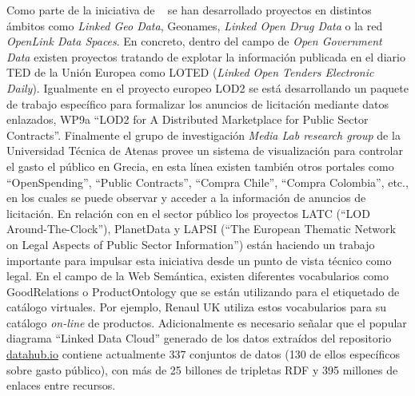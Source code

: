 \documentclass[a4paper,final,11pt,fleqn,twoside]{book}  %
\begin{document}
Como parte de la iniciativa de \lod~\cite{common-vocabularies} se han desarrollado proyectos en distintos 
ámbitos como \textit{Linked Geo Data}, Geonames, \textit{Linked Open Drug Data} o la red 
\textit{OpenLink Data Spaces}. En concreto, dentro del campo de \textit{Open Government Data} 
existen proyectos tratando de explotar la información publicada en el diario TED de la Unión Europea como LOTED (\textit{Linked Open Tenders
Electronic Daily}). Igualmente en el proyecto europeo LOD2 se está desarrollando un paquete 
de trabajo específico para formalizar los anuncios de licitación mediante datos enlazados, 
WP9a ``LOD2 for A Distributed Marketplace for Public Sector Contracts''. Finalmente el grupo 
de investigación \textit{Media Lab research group} de la Universidad Técnica de Atenas provee 
un sistema de visualización para controlar el gasto el público en Grecia, en esta línea existen también otros portales 
como ``OpenSpending'', ``Public Contracts'', ``Compra Chile'', ``Compra Colombia'', etc., en los cuales se 
puede observar y acceder a la información de anuncios de licitación. En relación con \lod en el sector público 
los proyectos LATC (``LOD Around-The-Clock''), PlanetData y LAPSI (``The European Thematic Network on Legal Aspects of Public Sector Information'') 
están haciendo un trabajo importante para impulsar esta iniciativa desde un punto de vista técnico como legal. 
En el campo de la Web Semántica, existen diferentes vocabularios como GoodRelations o ProductOntology que se están utilizando para el etiquetado 
de catálogo virtuales. Por ejemplo, Renaul UK utiliza estos vocabularios para su catálogo \textit{on-line} de productos. 
Adicionalmente es necesario señalar que el popular diagrama ``Linked Data Cloud'' generado de los datos extraídos del repositorio \url{datahub.io} 
contiene actualmente 337 conjuntos de datos (130 de ellos específicos sobre gasto público), con más de 25 billones 
de tripletas RDF y 395 millones de enlaces entre recursos. 
\end{document}

